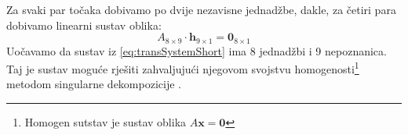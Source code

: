 Za svaki par točaka dobivamo po dvije nezavisne jednadžbe, dakle, za četiri para dobivamo linearni sustav oblika:
\begin{equation}
\label{eq:transSystemShort}
A_{8\times9} \cdot \mathbf{h}_{9\times1} = \mathbf{0}_{8\times1}
\end{equation}
Uočavamo da sustav iz \eqref{eq:transSystemShort} ima 8 jednadžbi i 9 nepoznanica. Taj je sustav moguće rješiti zahvaljujući njegovom svojstvu homogenosti\footnote{Homogen sutstav je sustav oblika $A\mathbf{x} = \mathbf{0}$} metodom singularne dekompozicije .
